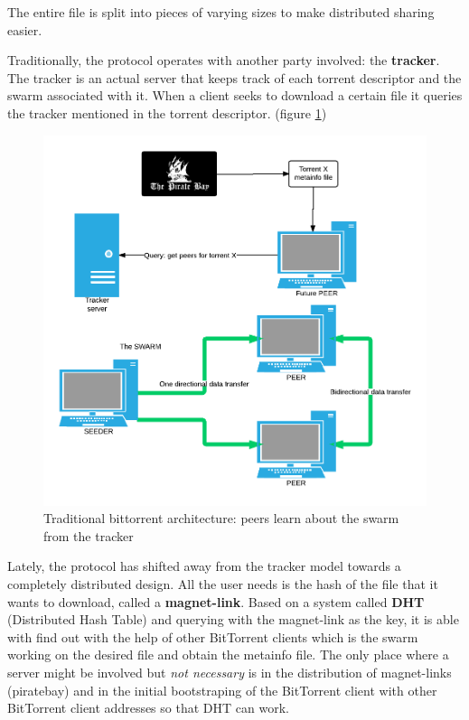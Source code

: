 \documentclass[11pt]{book} %
\begin{document}
The entire file is split into pieces of varying sizes to make distributed sharing easier.

Traditionally, the protocol operates with another party involved: the \textbf{tracker}. The tracker is an actual server that keeps track of each torrent descriptor and the swarm associated with it. When a client seeks to download a certain file it queries the tracker mentioned in the torrent descriptor. (figure \ref{fig:btClassic})

\begin{figure}[h!]
\begin{center}
\includegraphics[scale=0.4]{btClassic}
\end{center}
 \caption{Traditional bittorrent architecture: peers learn about the swarm from the tracker}
 \label{fig:btClassic}
 \end{figure}

Lately, the protocol has shifted away from the tracker model towards a completely distributed design. All the user needs is the hash of the file that it wants to download, called a \textbf{magnet-link}. Based on a system called \textbf{DHT} (Distributed Hash Table) and querying with the magnet-link as the key, it is able with find out with the help of other BitTorrent clients which is the swarm working on the desired file and obtain the metainfo file. The only place where a server might be involved but \textit{not necessary} is in the distribution of magnet-links (piratebay) and in the initial bootstraping of the BitTorrent client with other BitTorrent client addresses so that DHT can work.
\end{document}
